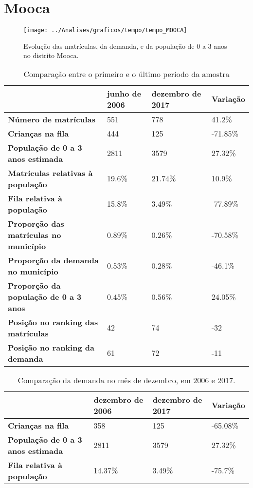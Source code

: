 \section{Mooca}
\begin{figure}[H]
\centering
\texttt{[image: ../Analises/graficos/tempo/tempo\_MOOCA]}
\caption{Evolução das matrículas, da demanda, e da população de 0 a 3 anos no distrito Mooca.}
\end{figure}
\begin{table}[H]
\begin{tabular}{|l|l|l|l|}
\hline
\textbf{}                                      & \textbf{junho de 2006}       & \textbf{dezembro de 2017}    & \textbf{Variação} \\ \hline
\textbf{Número de matrículas}                  & 551 & 778 & 41.2\% \\ \hline
\textbf{Crianças na fila}                      & 444 & 125 & -71.85\% \\ \hline
\textbf{População de 0 a 3 anos estimada}      & 2811 & 3579 & 27.32\% \\ \hline
\textbf{Matrículas relativas à população}      & 19.6\% & 21.74\% & 10.9\% \\ \hline
\textbf{Fila relativa à população}             & 15.8\% & 3.49\% & -77.89\% \\ \hline
\textbf{Proporção das matrículas no município} & 0.89\% & 0.26\% & -70.58\% \\ \hline
\textbf{Proporção da demanda no município}     & 0.53\% & 0.28\% & -46.1\% \\ \hline
\textbf{Proporção da população de 0 a 3 anos}  & 0.45\% & 0.56\% & 24.05\% \\ \hline
\textbf{Posição no ranking das matrículas}     & 42 & 74 & -32 \\ \hline
\textbf{Posição no ranking da demanda}         & 61 & 72 & -11 \\ \hline
\end{tabular}
\caption{Comparação entre o primeiro e o último período da amostra}
\end{table}
\begin{table}[H]
\begin{tabular}{|l|l|l|l|}
\hline
\textbf{}                                 & \textbf{dezembro de 2006} & \textbf{dezembro de 2017} & \textbf{Variação} \\ \hline
\textbf{Crianças na fila}                      & 358 & 125 & -65.08\% \\ \hline
\textbf{População de 0 a 3 anos estimada}      & 2811 & 3579 & 27.32\% \\ \hline
\textbf{Fila relativa à população}             & 14.37\% & 3.49\% & -75.7\% \\ \hline
\end{tabular}
\caption{Comparação da demanda no mês de dezembro, em 2006 e 2017.}
\end{table}
